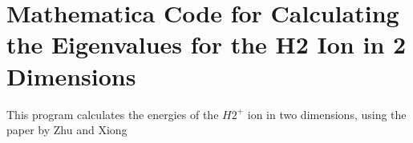\chapter{Mathematica Code for Calculating the Eigenvalues for the H2 Ion in 2 Dimensions}
\label{AppendixB}

This program calculates the energies of the $ H2^{+} $ ion in two dimensions, using the paper by Zhu and Xiong \cite{H2Plus2d2}



